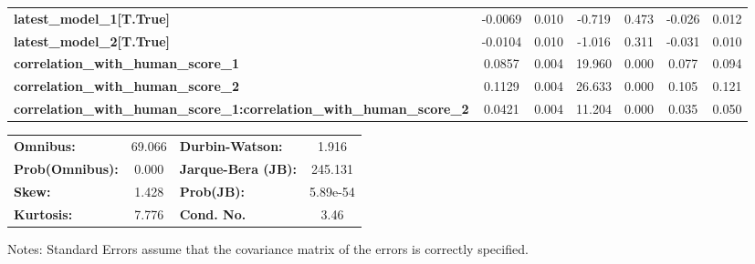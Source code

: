 \begin{center}
\begin{tabular}{lcccccc}
\textbf{latest\_model\_1[T.True]}                                              &      -0.0069  &        0.010     &    -0.719  &         0.473        &       -0.026    &        0.012     \\
\textbf{latest\_model\_2[T.True]}                                              &      -0.0104  &        0.010     &    -1.016  &         0.311        &       -0.031    &        0.010     \\
\textbf{correlation\_with\_human\_score\_1}                                    &       0.0857  &        0.004     &    19.960  &         0.000        &        0.077    &        0.094     \\
\textbf{correlation\_with\_human\_score\_2}                                    &       0.1129  &        0.004     &    26.633  &         0.000        &        0.105    &        0.121     \\
\textbf{correlation\_with\_human\_score\_1:correlation\_with\_human\_score\_2} &       0.0421  &        0.004     &    11.204  &         0.000        &        0.035    &        0.050     \\
\bottomrule
\end{tabular}
\begin{tabular}{lclc}
\textbf{Omnibus:}       & 69.066 & \textbf{  Durbin-Watson:     } &    1.916  \\
\textbf{Prob(Omnibus):} &  0.000 & \textbf{  Jarque-Bera (JB):  } &  245.131  \\
\textbf{Skew:}          &  1.428 & \textbf{  Prob(JB):          } & 5.89e-54  \\
\textbf{Kurtosis:}      &  7.776 & \textbf{  Cond. No.          } &     3.46  \\
\bottomrule
\end{tabular}
\end{center}

Notes: \newline
 [1] Standard Errors assume that the covariance matrix of the errors is correctly specified.